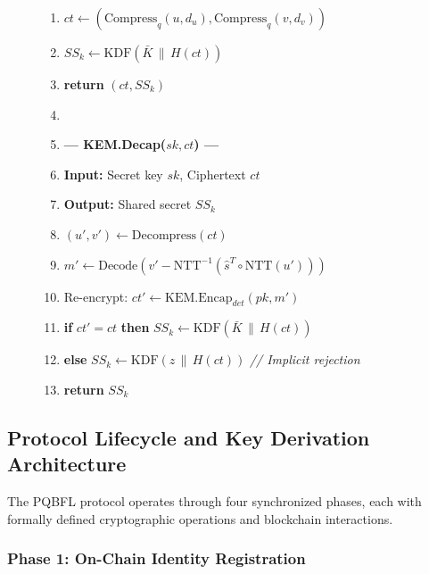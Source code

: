 \documentclass[journal, 10pt, twocolumn]{IEEEtran}
\begin{document}
\begin{figure}[!t]
\begin{enumerate}
    \item $ct \leftarrow (\text{Compress}_q(u, d_u), \text{Compress}_q(v, d_v))$
    \item $SS_k \leftarrow \text{KDF}(\bar{K} \,\|\, H(ct))$
    \item \textbf{return} $(ct, SS_k)$
    \item[]
    \item[] \textbf{--- KEM.Decap($sk, ct$) ---}
    \item \textbf{Input:} Secret key $sk$, Ciphertext $ct$
    \item \textbf{Output:} Shared secret $SS_k$
    \item $(u', v') \leftarrow \text{Decompress}(ct)$
    \item $m' \leftarrow \text{Decode}(v' - \text{NTT}^{-1}(\hat{s}^T \circ \text{NTT}(u')))$
    \item Re-encrypt: $ct' \leftarrow \text{KEM.Encap}_{det}(pk, m')$
    \item \textbf{if} $ct' = ct$ \textbf{then} $SS_k \leftarrow \text{KDF}(\bar{K} \,\|\, H(ct))$
    \item \textbf{else} $SS_k \leftarrow \text{KDF}(z \,\|\, H(ct))$ \quad \textit{// Implicit rejection}
    \item \textbf{return} $SS_k$
\end{enumerate}
\hrulefill
\end{figure}

\subsection{Protocol Lifecycle and Key Derivation Architecture}

The PQBFL protocol operates through four synchronized phases, each with formally defined cryptographic operations and blockchain interactions.

\subsubsection{Phase 1: On-Chain Identity Registration}
\end{document}
